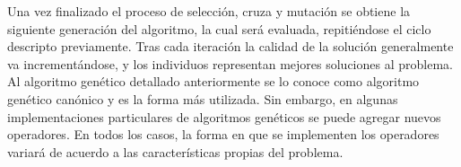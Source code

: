 Una vez finalizado el proceso de selecci\'on, cruza y mutaci\'on se obtiene la
siguiente generaci\'on del algoritmo, la cual ser\'a evaluada, repiti\'endose el ciclo
descripto previamente. Tras cada iteraci\'on la calidad de la soluci\'on
generalmente va increment\'andose, y los individuos representan mejores
soluciones al problema.
Al algoritmo gen\'etico detallado anteriormente se lo conoce como algoritmo
gen\'etico can\'onico y es la forma m\'as utilizada. Sin embargo, en algunas
implementaciones particulares de algoritmos gen\'eticos se puede agregar
nuevos operadores. En todos los casos, la forma en que se implementen los
operadores variar\'a de acuerdo a las caracter\'isticas propias del problema. 
	

